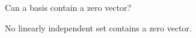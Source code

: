 
\begin{Exercise}[
name={},
title={}, 
difficulty=0,
origin={\cite{JH}}]
Can a basis contain a zero vector?
\end{Exercise}

\begin{Answer}
No linearly independent set contains a zero vector.  
\end{Answer}

